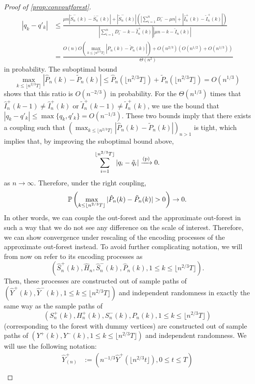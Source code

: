 \begin{proof}[Proof of \cref{prop:convoutforest}]
\begin{align*}|q_k-q'_k|&\leq \frac{\mu n \left| \tilde{S}^-_n(k)-\bar{S}^-_n(k)\right|+\left|\tilde{S}^-_n(k)\right|\left(\left|\sum_{i=1}^n D^-_i-\mu n \right|+ \left|\hat{I}^+_n(k)- \tilde{I}^+_n(k) \right|\right) }{\left|\sum_{i=1}^n D^-_i-k-\hat{I}^+_n(k)\right| \left|\mu n-k-\tilde{I}_n(k)\right|}\\
&=\frac{ O(n)O\left(\max_{k\leq \lfloor n^{2/3} T \rfloor}|\hat{P}_n(k)-\tilde{P}_n(k)|\right)+O(n^{2/3})\left(O(n^{1/2})+O(n^{1/3})\right)}{\Theta(n^2)}\end{align*} 
in probability.
The suboptimal bound \[\max_{k\leq \lfloor n^{2/3} T \rfloor}|\hat{P}_n(k)-\tilde{P}_n(k)|\leq \hat{P}_n\left(\lfloor n^{2/3} T \rfloor\right)+\tilde{P}_n\left(\lfloor n^{2/3} T \rfloor\right)=O(n^{1/3})\]
shows that this ratio is $O(n^{-2/3})$ in probability. 
For the $\Theta(n^{1/3})$ times that $\hat{I}^+_n(k-1)\neq \hat{I}^+_n(k)$ or  $\tilde{I}^+_n(k-1)\neq \tilde{I}^+_n(k)$, we use the bound that $|q_k-q'_k|\leq \max \{q_k,q'_k\}=O(n^{-1/3})$. 
These two bounds imply that there exists a coupling such that $\left(\max_{k\leq \lfloor n^{2/3}T\rfloor } |\hat{P}_n(k)-\tilde{P}_n(k)|\right)_{n>1}$ is tight, which implies that, by improving the suboptimal bound above, $$\sum_{i=1}^{\lfloor n^{2/3}T\rfloor }|q_i-\tilde{q}_i|\xrightarrow[]{\mathrm{(p)}}0.$$
as $n\to \infty$. 
Therefore, under the right coupling, 
$$\P\left(\max_{k\leq \lfloor n^{2/3} T \rfloor}|\hat{P}_n(k)-\tilde{P}_n(k)|>0\right)\to 0.$$
In other words, we can couple the out-forest and the approximate out-forest in such a way that we do not see any difference on the scale of interest. Therefore, we can show convergence under rescaling of the encoding processes of the approximate out-forest instead. To avoid further complicating notation, we will from now on refer to its encoding processes as $$(\hat{S}^{+}_n(k),\hat{H}_n, \hat{S}^-_n(k), \hat{P}_n(k),1\leq k\leq \lfloor n^{2/3}T\rfloor).$$ Then, these processes are constructed out of sample paths of $(\hat{Y}^+(k),\hat{Y}^-(k), 1\leq k\leq \lfloor n^{2/3}T\rfloor )$ and independent randomness in exactly the same way as the sample paths of $$({S}_n^{+}(k),{H}_n^+(k),{S}_n^-(k),P_n(k),1\leq  k \leq \lfloor n^{2/3}T\rfloor )$$  (corresponding to the forest with dummy vertices) are constructed out of sample paths of $(Y^+(k),Y^-(k),1\leq  k\leq \lfloor n^{2/3}T\rfloor )$ and independent randomness. 
We will use the following notation:\begin{align*}
    \hat{Y}^+_{(n)}&:=\left(n^{-1/3}\hat{Y}^+\left(\lfloor n^{2/3} t \rfloor\right),0\leq t \leq T\right)\\

\end{align*}
\end{proof}
